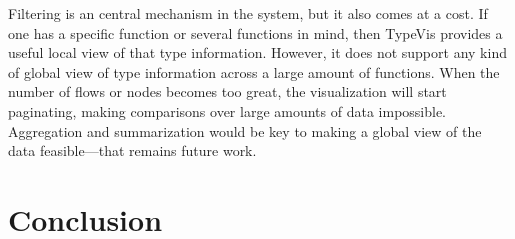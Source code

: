 \documentclass{vgtc}                          %
\begin{document}
Filtering is an central mechanism in the system,
but it also comes at a cost.
If one has a specific function or several functions
in mind, then {\sc TypeVis} provides a useful
local view of that type information.
However, it does not support any kind of global
view of type information across a large amount of
functions. When the number of flows or nodes
becomes too great, the visualization will start
paginating, making comparisons over large amounts
of data impossible.
Aggregation and summarization would be key to
making a global view of the data feasible---that
remains future work.


\section{Conclusion}









\end{document}
